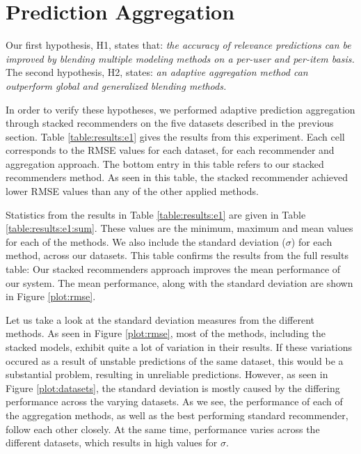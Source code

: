 \section{Prediction Aggregation}



Our first hypothesis, H1, states that:
{
  \itshape
  the accuracy of relevance predictions can be improved
  by blending multiple modeling methods on a per-user and per-item basis.
}
The second hypothesis, H2, states:
{
  \itshape
  an adaptive aggregation method can outperform global and generalized 
  blending methods.
}

In order to verify these hypotheses, we performed adaptive prediction aggregation
through stacked recommenders on the five datasets described in the previous section.
Table \ref{table:results:e1} gives the results from this experiment.
Each cell corresponds to the RMSE values for each dataset,
for each recommender and aggregation approach.
The bottom entry in this table refers to our stacked recommenders method.
As seen in this table, the stacked recommender achieved
lower RMSE values than any of the other applied methods.

Statistics from the results in Table \ref{table:results:e1} 
are given in Table \ref{table:results:e1:sum}.
These values are the minimum, maximum and mean values
for each of the methods. We also include
the standard deviation ($\sigma$) for each method,
across our datasets.
This table confirms the results from the full results table:
Our stacked recommenders approach improves the mean performance
of our system.
The mean performance, along with the standard deviation
are shown in Figure \ref{plot:rmse}.





Let us take a look at the standard deviation measures from the different methods.
As seen in Figure \ref{plot:rmse}, 
most of the methods, including the stacked models,
exhibit quite a lot of variation in their results.
If these variations occured as a result of unstable
predictions of the same dataset, this would be a substantial problem,
resulting in unreliable predictions.
However, as seen in Figure \ref{plot:datasets},
the standard deviation is mostly caused by the differing
performance across the varying datasets.
As we see, the performance of each of the aggregation methods,
as well as the best performing standard recommender,
follow each other closely. At the same time,
performance varies across the different datasets,
which results in high values for $\sigma$.

